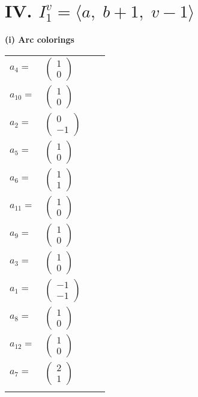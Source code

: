 \documentclass[1p]{elsarticle_modified}
\theoremstyle{definition}
\begin{document}
\centering \section*{IV. $I^v_{1}= \langle a,\;b+1,\;v-1 \rangle$}
\flushleft \textbf{(i) Arc colorings}\\
\begin{tabular}{m{7pt} m{180pt} m{7pt} m{180pt} }
\flushright $a_{4}=$&$\begin{pmatrix}1\\0\end{pmatrix}$ \\
\flushright $a_{10}=$&$\begin{pmatrix}1\\0\end{pmatrix}$ \\
\flushright $a_{2}=$&$\begin{pmatrix}0\\-1\end{pmatrix}$ \\
\flushright $a_{5}=$&$\begin{pmatrix}1\\0\end{pmatrix}$ \\
\flushright $a_{6}=$&$\begin{pmatrix}1\\1\end{pmatrix}$ \\
\flushright $a_{11}=$&$\begin{pmatrix}1\\0\end{pmatrix}$ \\
\flushright $a_{9}=$&$\begin{pmatrix}1\\0\end{pmatrix}$ \\
\flushright $a_{3}=$&$\begin{pmatrix}1\\0\end{pmatrix}$ \\
\flushright $a_{1}=$&$\begin{pmatrix}-1\\-1\end{pmatrix}$ \\
\flushright $a_{8}=$&$\begin{pmatrix}1\\0\end{pmatrix}$ \\
\flushright $a_{12}=$&$\begin{pmatrix}1\\0\end{pmatrix}$ \\
\flushright $a_{7}=$&$\begin{pmatrix}2\\1\end{pmatrix}$\\&\end{tabular}
\end{document}
